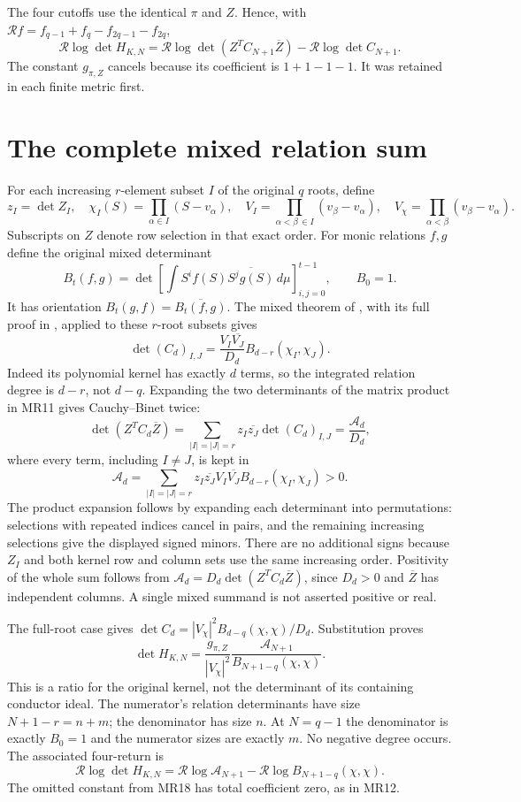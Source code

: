 \documentclass[11pt]{article}
\begin{document}
The four cutoffs use the identical $\pi$ and $Z$. Hence, with
$\mathcal R f=f_{q-1}+f_q-f_{2q-1}-f_{2q}$,
\[
 \mathcal R\log\det H_{K,N}
 =\mathcal R\log\det(Z^TC_{N+1}\overline Z)
  -\mathcal R\log\det C_{N+1}.\tag{MR12}
\]
The constant $g_{\pi,Z}$ cancels because its coefficient is $1+1-1-1$.
It was retained in each finite metric first.

\section{The complete mixed relation sum}
For each increasing $r$-element subset $I$ of the original $q$ roots,
define
\[
 z_I=\det Z_I,\quad
 \chi_I(S)=\prod_{\alpha\in I}(S-v_\alpha),\quad
 V_I=\prod_{\alpha<\beta\,\in I}(v_\beta-v_\alpha),\quad
 V_\chi=\prod_{\alpha<\beta}(v_\beta-v_\alpha).\tag{MR13}
\]
Subscripts on $Z$ denote row selection in that exact order.
For monic relations $f,g$ define the original mixed determinant
\[
 B_t(f,g)=\det\left[\int S^if(S)
                    \overline{S^jg(S)}\,d\mu\right]_{i,j=0}^{t-1},
 \qquad B_0=1.\tag{MR14}
\]
It has orientation $B_t(g,f)=\overline{B_t(f,g)}$.
The mixed theorem of \cite{AV}, with its full proof in \cite{Mixed},
applied to these $r$-root subsets gives
\[
 \det(C_d)_{I,J}
  =\frac{V_I\overline{V_J}}{D_d}
           B_{d-r}(\chi_I,\chi_J).\tag{MR15}
\]
Indeed its polynomial kernel has exactly $d$ terms, so the integrated
relation degree is $d-r$, not $d-q$. Expanding the two determinants
of the matrix product in MR11 gives Cauchy--Binet twice:
\[
 \det(Z^TC_d\overline Z)
  =\sum_{|I|=|J|=r}z_I\overline{z_J}\det(C_d)_{I,J}
  =\frac{\mathcal A_d}{D_d},\tag{MR16}
\]
where every term, including $I\ne J$, is kept in
\[
 \mathcal A_d=
 \sum_{|I|=|J|=r}z_I\overline{z_J}V_I\overline{V_J}
                     B_{d-r}(\chi_I,\chi_J)>0.\tag{MR17}
\]
The product expansion follows by expanding each determinant into
permutations: selections with repeated indices cancel in pairs, and
the remaining increasing selections give the displayed signed minors.
There are no additional signs because $Z_I$ and both kernel row and
column sets use the same increasing order.
Positivity of the whole sum follows from
$\mathcal A_d=D_d\det(Z^TC_d\overline Z)$, since $D_d>0$ and
$\overline Z$ has independent columns. A single mixed summand is not
asserted positive or real.

The full-root case gives
$\det C_d=|V_\chi|^2 B_{d-q}(\chi,\chi)/D_d$. Substitution proves
\[
 \boxed{\det H_{K,N}
   =\frac{g_{\pi,Z}}{|V_\chi|^2}
      \frac{\mathcal A_{N+1}}{B_{N+1-q}(\chi,\chi)}.}
 \tag{MR18}
\]
This is a ratio for the original kernel, not the determinant of its
containing conductor ideal. The numerator's relation determinants
have size $N+1-r=n+m$; the denominator has size $n$. At $N=q-1$ the
denominator is exactly $B_0=1$ and the numerator sizes are exactly $m$.
No negative degree occurs. The associated four-return is
\[
 \boxed{\mathcal R\log\det H_{K,N}
   =\mathcal R\log\mathcal A_{N+1}
      -\mathcal R\log B_{N+1-q}(\chi,\chi).}\tag{MR19}
\]
The omitted constant from MR18 has total coefficient zero, as in MR12.
\end{document}
